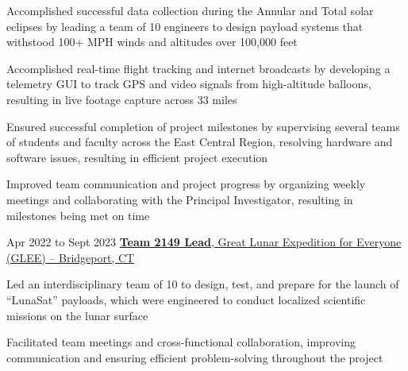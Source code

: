     \vspace{0.15 cm}
    \begin{onecolentry}
        \begin{highlights}
            \item Accomplished successful data collection during the Annular and Total solar eclipses by leading a team of 10 engineers to design payload systems that withstood 100+ MPH winds and altitudes over 100,000 feet
            \item Accomplished real-time flight tracking and internet broadcasts by developing a telemetry GUI to track GPS and video signals from high-altitude balloons, resulting in live footage capture across 33 miles
            \item Ensured successful completion of project milestones by supervising several teams of students and faculty across the East Central Region, resolving hardware and software issues, resulting in efficient project execution
            \item Improved team communication and project progress by organizing weekly meetings and collaborating with the Principal Investigator, resulting in milestones being met on time
        \end{highlights}
    \end{onecolentry}

    \vspace{0.2 cm}

    \begin{twocolentry}{
        Apr 2022 to Sept 2023
    }
        \href{https://www.glee2023.org}{\textbf{Team 2149 Lead}, Great Lunar Expedition for Everyone (GLEE) -- Bridgeport, CT}
    \end{twocolentry}

    \vspace{0.15 cm}
    \begin{onecolentry}
        \begin{highlights}
          \item Led an interdisciplinary team of 10 to design, test, and prepare for the launch of “LunaSat” payloads, which were engineered to conduct localized scientific missions on the lunar surface
          \item Facilitated team meetings and cross-functional collaboration, improving communication and ensuring efficient problem-solving throughout the project
        \end{highlights}
    \end{onecolentry}